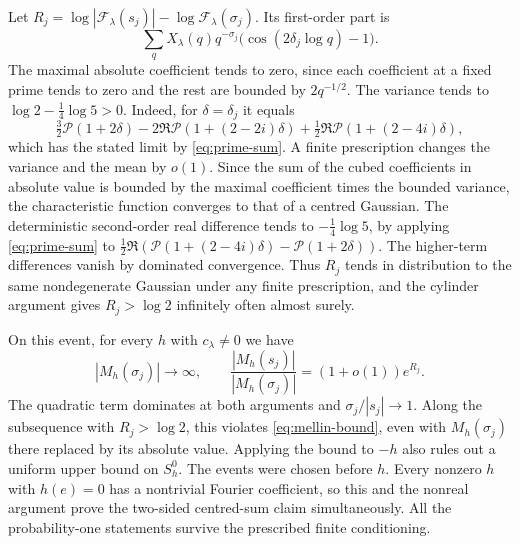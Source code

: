 \documentclass[11pt,reqno]{amsart}
\begin{document}
Let \(R_j=\log|\mathcal F_\lambda(s_j)|-\log\mathcal F_\lambda(\sigma_j)\). Its first-order part is
\[
 \sum_q X_\lambda(q)q^{-\sigma_j}
                   \big(\cos(2\delta_j\log q)-1\big).
\]
The maximal absolute coefficient tends to zero, since each coefficient at a fixed prime tends to zero and the rest are bounded by \(2q^{-1/2}\). The variance tends to \(\log 2-\frac14\log 5>0\). Indeed, for \(\delta=\delta_j\) it equals
\[
 \tfrac32\mathcal P(1+2\delta)
 -2\Re\mathcal P(1+(2-2i)\delta)
 +\tfrac12\Re\mathcal P(1+(2-4i)\delta),
\]
which has the stated limit by \eqref{eq:prime-sum}. A finite prescription changes the variance and the mean by \(o(1)\). Since the sum of the cubed coefficients in absolute value is bounded by the maximal coefficient times the bounded variance, the characteristic function converges to that of a centred Gaussian. The deterministic second-order real difference tends to \(-\frac14\log 5\), by applying \eqref{eq:prime-sum} to
\(\tfrac12\Re(\mathcal P(1+(2-4i)\delta)-\mathcal P(1+2\delta))\).
The higher-term differences vanish by dominated convergence. Thus \(R_j\) tends in distribution to the same nondegenerate Gaussian under any finite prescription, and the cylinder argument gives \(R_j>\log 2\) infinitely often almost surely.

On this event, for every \(h\) with \(c_\lambda\ne0\) we have
\[
 |M_h(\sigma_j)|\to\infty,\qquad
 \frac{|M_h(s_j)|}{|M_h(\sigma_j)|}=(1+o(1))e^{R_j}.
\]
The quadratic term dominates at both arguments and \(\sigma_j/|s_j|\to1\). Along the subsequence with \(R_j>\log2\), this violates \eqref{eq:mellin-bound}, even with \(M_h(\sigma_j)\) there replaced by its absolute value. Applying the bound to \(-h\) also rules out a uniform upper bound on \(S_h^0\). The events were chosen before \(h\). Every nonzero \(h\) with \(h(e)=0\) has a nontrivial Fourier coefficient, so this and the nonreal argument prove the two-sided centred-sum claim simultaneously. All the probability-one statements survive the prescribed finite conditioning.
\end{document}
